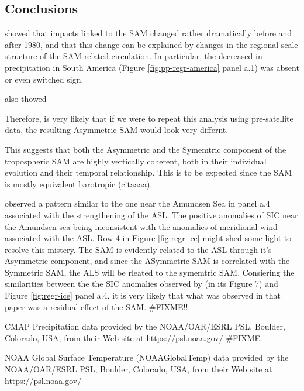 \documentclass[]{ametsocV5}
\begin{document}
\subsection{Conclusions}

\citet{silvestri2009} showed that impacts linked to the SAM changed
rather dramatically before and after 1980, and that this change can be
explained by changes in the regional-scale structure of the SAM-related
circulation. In particular, the decreased in precipitation in South
America (Figure \ref{fig:pp-regr-america} panel a.1) was absent or even
switched sign.

\citet{silvestri2009} also thowed

Therefore, is very likely that if we were to repeat this analysis using
pre-satellite data, the resulting Asymmetric SAM would look very
differnt.

This suggests that both the Asymmetric and the Symemtric component of
the tropospheric SAM are highly vertically coherent, both in their
individual evolution and their temporal relationship. This is to be
expected since the SAM is mostly equivalent barotropic (citaaaa).

\citet{hosking2013} observed a pattern similar to the one near the
Amundsen Sea in panel a.4 associated with the strengthening of the ASL.
The positive anomalies of SIC near the Amundsen sea being inconsistent
with the anomalies of meridional wind associated with the ASL. Row 4 in
Figure \ref{fig:regr-ice} might shed some light to resolve this mistery.
The SAM is evidently related to the ASL through it's Asymmetric
component, and since the ASymmetric SAM is correlated with the Symmetric
SAM, the ALS will be rleated to the symemtric SAM. Consiering the
similarities between the the SIC anomalies observed by
\citet{hosking2013} (in its Figure 7) and Figure \ref{fig:regr-ice}
panel a.4, it is very likely that what was observed in that paper was a
residual effect of the SAM. \#FIXME!!

\acknowledgments

CMAP Precipitation data provided by the NOAA/OAR/ESRL PSL, Boulder,
Colorado, USA, from their Web site at https://psl.noaa.gov/ \#FIXME

NOAA Global Surface Temperature (NOAAGlobalTemp) data provided by the
NOAA/OAR/ESRL PSL, Boulder, Colorado, USA, from their Web site at
https://psl.noaa.gov/



\newpage

\appendix
\end{document}
